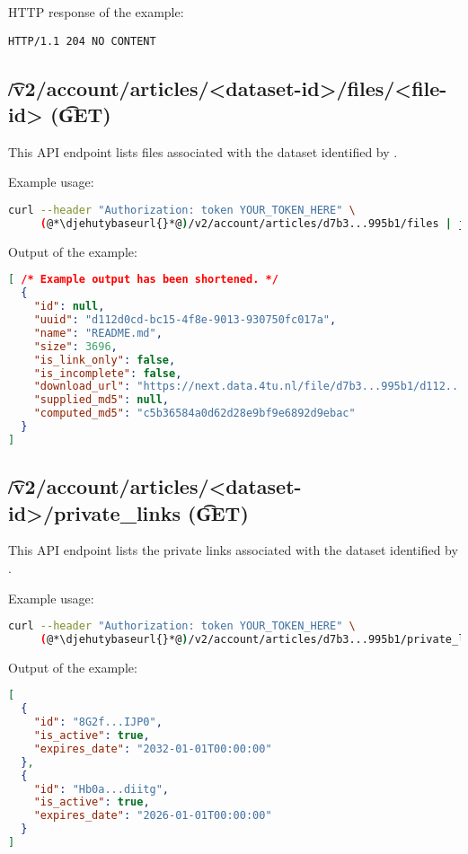   HTTP response of the example:
\begin{lstlisting}
HTTP/1.1 204 NO CONTENT
\end{lstlisting}

\subsection{\t{/v2/account/articles/<dataset-id>/files/<file-id>} (\t{GET})}

  This API endpoint lists files associated with the dataset identified by
  .

  Example usage:
\begin{lstlisting}[language=bash]
curl --header "Authorization: token YOUR_TOKEN_HERE" \
     (@*\djehutybaseurl{}*@)/v2/account/articles/d7b3...995b1/files | jq
\end{lstlisting}

  Output of the example:
\begin{lstlisting}[language=JSON]
[ /* Example output has been shortened. */
  {
    "id": null,
    "uuid": "d112d0cd-bc15-4f8e-9013-930750fc017a",
    "name": "README.md",
    "size": 3696,
    "is_link_only": false,
    "is_incomplete": false,
    "download_url": "https://next.data.4tu.nl/file/d7b3...995b1/d112...c017a",
    "supplied_md5": null,
    "computed_md5": "c5b36584a0d62d28e9bf9e6892d9ebac"
  }
]
\end{lstlisting}

\subsection{\t{/v2/account/articles/<dataset-id>/private\_links} (\t{GET})}

  This API endpoint lists the private links associated with the dataset
  identified by \code{dataset-id}.

  Example usage:
\begin{lstlisting}[language=bash]
curl --header "Authorization: token YOUR_TOKEN_HERE" \
     (@*\djehutybaseurl{}*@)/v2/account/articles/d7b3...995b1/private_links | jq
\end{lstlisting}

  Output of the example:
\begin{lstlisting}[language=JSON]
[
  {
    "id": "8G2f...IJP0",
    "is_active": true,
    "expires_date": "2032-01-01T00:00:00"
  },
  {
    "id": "Hb0a...diitg",
    "is_active": true,
    "expires_date": "2026-01-01T00:00:00"
  }
]
\end{lstlisting}

